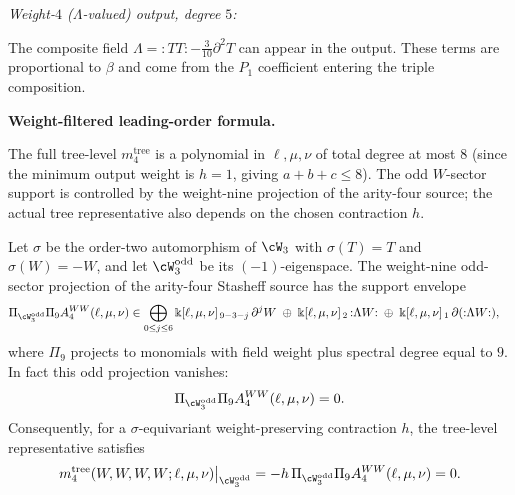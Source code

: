 \smallskip
\emph{Weight-$4$ ($\Lambda$-valued) output, degree $5$:}

The composite field $\Lambda = {:}TT{:} - \tfrac{3}{10}\partial^2 T$
can appear in the output. These terms are proportional to $\beta$
and come from the $P_1$ coefficient entering the triple composition.

\medskip
\noindent\textbf{Weight-filtered leading-order formula.}

The full tree-level $m_4^{\mathrm{tree}}$ is a polynomial in
$\ell, \mu, \nu$ of total degree at most $8$ (since the
minimum output weight is $h=1$, giving $a+b+c \le 8$).
The odd \(W\)-sector support is controlled by the weight-nine
projection of the arity-four source; the actual tree representative
also depends on the chosen contraction \(h\).

\begin{theorem}
\label{thm:m4-WWWW-tree}
Let \(\sigma\) be the order-two automorphism of \(\cW_3\) with
\(\sigma(T)=T\) and \(\sigma(W)=-W\), and let
\(\cW_3^{\mathrm{odd}}\) be its \((-1)\)-eigenspace.  The
weight-nine odd-sector projection of the arity-four Stasheff source
has the support envelope
\begin{align}
\label{eq:m4-WWWW-explicit}
\Pi_{\cW_3^{\mathrm{odd}}}\Pi_{9}
A_4^{WW}(\ell,\mu,\nu)
&\in
\bigoplus_{0\leq j\leq6}\Bbbk[\ell,\mu,\nu]_{\,9-3-j}\,\partial^{j}W
\;\oplus\;
\Bbbk[\ell,\mu,\nu]_{\,2}\,{:}\Lambda W{:}
\;\oplus\;
\Bbbk[\ell,\mu,\nu]_{\,1}\,\partial({:}\Lambda W{:}),
\end{align}
where \(\Pi_{9}\) projects to monomials with field weight plus
spectral degree equal to \(9\).  In fact this odd projection vanishes:
\begin{equation}
\label{eq:m4-WWWW-odd-vanishing}
\Pi_{\cW_3^{\mathrm{odd}}}\Pi_{9}A_4^{WW}(\ell,\mu,\nu)=0.
\end{equation}
Consequently, for a \(\sigma\)-equivariant weight-preserving
contraction \(h\), the tree-level representative satisfies
\begin{equation}
\label{eq:m4-WWWW-equivariant-odd-zero}
m_4^{\mathrm{tree}}(W,W,W,W;\ell,\mu,\nu)
\big|_{\cW_3^{\mathrm{odd}}}
=
-h\,\Pi_{\cW_3^{\mathrm{odd}}}\Pi_{9}A_4^{WW}(\ell,\mu,\nu)
=0.
\end{equation}
\end{theorem}

